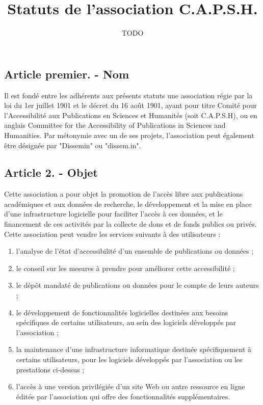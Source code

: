 \documentclass[a4paper]{article}
\title{Statuts de l'association C.A.P.S.H.}
\date{TODO}
\begin{document}
\maketitle

\subsection*{Article premier. - Nom}

Il est fondé entre les adhérents aux présents statuts une association régie par la loi du 1er juillet 1901 et le décret du 16 août 1901, ayant pour titre Comité pour l'Accessibilité aux Publications en Sciences et Humanités (soit C.A.P.S.H), ou en anglais
Committee for the Accessibility of Publications in Sciences and Humanities.
Par métonymie avec un de ses projets, l'association peut également être désignée par "Dissemin" ou "dissem.in".

\subsection*{Article 2. - Objet}

Cette association a pour objet la promotion de l'accès libre aux publications académiques et
aux données de recherche, le développement et la mise en place d'une infrastructure logicielle pour faciliter l'accès à ces données, et le financement de ces activités par la collecte de dons et de fonds publics ou privés.
Cette association peut vendre les services suivants à des utilisateurs :
\begin{enumerate}
    \item l'analyse de l'état d'accessibilité d'un ensemble de publications ou données ;
    \item le conseil sur les mesures à prendre pour améliorer cette accessibilité ;
    \item le dépôt mandaté de publications ou données pour le compte de leurs auteurs ;
    \item le développement de fonctionnalités logicielles destinées aux besoins spécifiques de certains utilisateurs, au sein des logiciels développés par l'association ;
    \item la maintenance d'une infrastructure informatique destinée spécifiquement à certains utilisateurs, pour les logiciels développés par l'association ou les prestations ci-dessus ;
    \item l'accès à une version privilégiée d'un site Web ou autre ressource en ligne éditée par l'association qui offre des fonctionnalités supplémentaires.
\end{enumerate}
\end{document}
